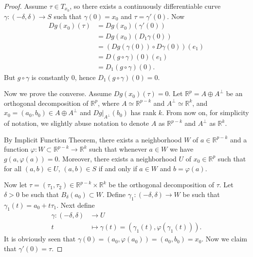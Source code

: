 \begin{proof}
	Assume $\tau \in T_{x_0}$, so there exists a continuously differentiable curve $\gamma: (-\delta, \delta) \to  S$ such that $\gamma(0) = x_0$ and $\tau = \gamma'(0)$. Now
	\begin{align*}
		D g(x_0)(\tau)
		&= Dg(x_0)(\gamma'(0)) \\
		&= Dg(x_0)(D_1 \gamma(0)) \\
		&= \left(Dg(\gamma(0)) \circ D\gamma(0)\right) (e_1)\\
		&= D(g \circ \gamma)(0)(e_1) \\
		&= D_1(g \circ \gamma)(0) 
	.\end{align*}
	But  $g \circ \gamma$ is constantly $0$, hence $D_1(g \circ \gamma) (0) = 0$.

	Now we prove the converse. Assume $Dg(x_0) (\tau) = 0$.
	Let $\mathbb{R}^p = A \oplus A^{\perp}$ be an orthogonal decomposition of $\mathbb{R}^p$, where $A \simeq \mathbb{R}^{p - k} $ and $A^{\perp} \simeq \mathbb{R}^k$, and $x_0 = (a_0, b_0) \in A \oplus A^{\perp}$ and $Dg|_{A^{\perp}} (b_0)$ has rank $k$. From now on, for simplicity of notation, we slightly abuse notation to denote $A$ as $\mathbb{R}^{p - k}$ and $A^{\perp}$ as $\mathbb{R}^k$.

	By Implicit Function Theorem, there exists a neighborhood $W$ of $a \in \mathbb{R}^{p - k}$ and a function $\varphi: W \subset \mathbb{R}^{p - k} \to \mathbb{R}^k$ such that whenever $a \in W$ we have $g(a, \varphi(a)) = 0$. Moreover, there exists a neighborhood $U$ of $x_0 \in \mathbb{R}^p$ such that for all $(a,b) \in U$, $(a,b) \in S$ if and only if $a \in W$ and $b = \varphi(a)$.

	Now let $\tau = (\tau_1, \tau_2) \in \mathbb{R}^{p - k} \times \mathbb{R}^k$ be the orthogonal decomposition of $\tau$. Let $\delta>0$ be such that $B_\delta(a_0) \subset W$. Define $\gamma_1: (-\delta, \delta) \to W$ be such that $\gamma_1(t) = a_0 + t\tau_1$. Next define 
	\begin{align*}
		\gamma: (-\delta,\delta) &\longrightarrow U \\
		t &\longmapsto \gamma(t) =  \left( \gamma_1(t), \varphi\left( \gamma_1(t) \right)  \right) 
	.\end{align*}
	It is obviously seen that  $\gamma(0) = (a_0 , \varphi(a_0)) = (a_0, b_0) = x_0$. Now we claim that $\gamma'(0) = \tau$.


\end{proof}
